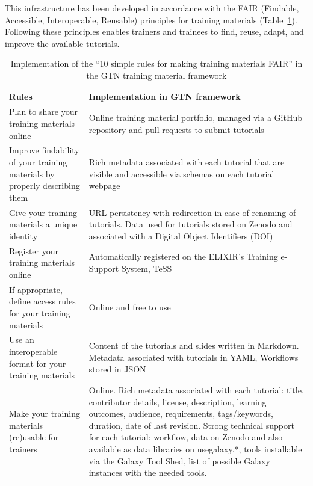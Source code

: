 \documentclass[10pt,letterpaper]{article}
\begin{document}
This infrastructure has been developed in accordance with the FAIR (Findable, Accessible, Interoperable, Reusable) principles for training materials \cite{Garcia2020} (Table~\ref{tbl:rulesforfair}).
Following these principles enables trainers and trainees to find, reuse, adapt, and improve the available tutorials. %

\begin{table}[h!]
	\centering
    \caption{Implementation of the ``10 simple rules for making training materials FAIR'' in the GTN training material framework
    \label{tbl:rulesforfair}}
	\begin{tabular}{p{}p{}}
		\textbf{Rules}                                                                & \textbf{Implementation in GTN framework}\\\hline
		Plan to share your training materials online                                  & Online training material portfolio, managed via a GitHub repository and pull requests to submit tutorials\\
		Improve findability of your training materials by properly describing them    & Rich metadata associated with each tutorial that are visible and accessible via schemas on each tutorial webpage\\
		Give your training materials a unique identity                                & URL persistency with redirection in case of renaming of tutorials.
		Data used for tutorials stored on Zenodo  and associated with a Digital Object Identifiers (DOI) \\
        Register your training materials online                                       & Automatically registered on the ELIXIR's Training e-Support System, TeSS  \\
        If appropriate, define access rules for your training materials               &	Online and free to use \\
        Use an interoperable format for your training materials                       &	Content of the tutorials and slides written in Markdown. Metadata associated with tutorials in YAML, Workflows stored in JSON\\
		Make your training materials (re)usable for trainers                          & Online. Rich metadata associated with each tutorial: title, contributor details, license, description, learning outcomes, audience, requirements, tags/keywords, duration, date of last revision. Strong technical support for each tutorial: workflow, data on Zenodo and also available as data libraries on usegalaxy.*, tools installable via the Galaxy Tool Shed, list of possible Galaxy instances with the needed tools.\\

\end{tabular}
\end{table}
\end{document}
